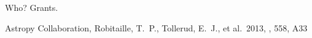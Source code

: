 \documentclass{aastex61}
\begin{document}
\acknowledgments
Who?
Grants.


\begin{thebibliography}{}

 Astropy Collaboration, Robitaille, T.~P., Tollerud, E.~J., et al.\ 2013, \aap, 558, A33 

\end{thebibliography}
\end{document}
